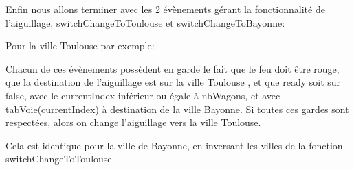 Enfin nous allons terminer avec les 2 évènements gérant la fonctionnalité de l'aiguillage, switchChangeToToulouse et switchChangeToBayonne:

Pour la ville Toulouse par exemple:

Chacun de ces évènements possèdent en garde le fait que le feu doit être rouge, que la destination de l'aiguillage est sur la ville Toulouse , et que ready soit sur false, avec le currentIndex inférieur ou égale à nbWagons, et avec tabVoie(currentIndex) à destination de la ville Bayonne.
Si toutes ces gardes sont respectées, alors on change l'aiguillage vers la ville Toulouse.

Cela est identique pour la ville de Bayonne, en inversant les villes de la fonction switchChangeToToulouse.
